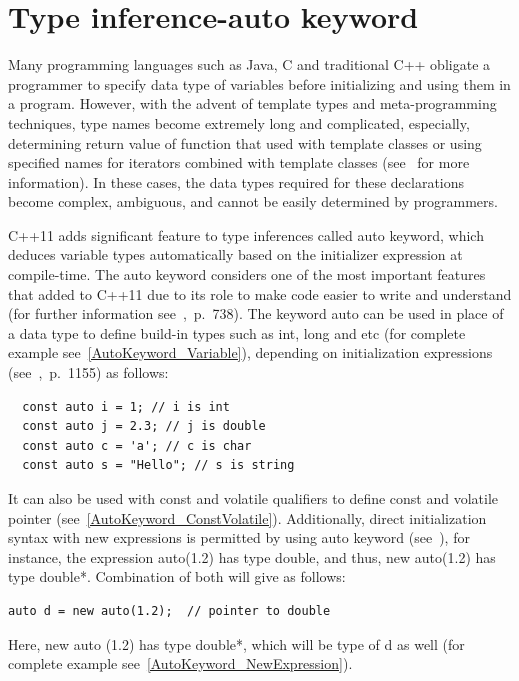 \documentclass[11pt]{report}
\begin{document}
\section{Type inference-auto keyword}
\label{section: Auto keyword}
Many programming languages such as Java, C and traditional C++ obligate a programmer to specify data type of variables before initializing and using them in a program. However, with the advent of template types and meta-programming techniques, type names become extremely long and complicated, especially, determining return value of function that used with template classes or using specified names for iterators combined with template classes (see~\cite{Stroustrup:2012:Cpp11} for more information). In these cases, the data types required for these declarations become complex, ambiguous, and cannot be easily determined by programmers.

C++11 adds significant feature to type inferences called auto keyword, which deduces variable types automatically based on the initializer expression at compile-time. The auto keyword considers one of the most important features that added to C++11 due to its role to make code easier to write and understand (for further information see~\cite{Gregorie:professionalcpp},~p.~738). The keyword auto can be used in place of a data type to define build-in types such as int, long and etc (for complete example see~\ref{AutoKeyword_Variable}), depending on initialization expressions (see~\cite{Prata:2012:Cpp},~p.~1155) as follows: 
\begin{lstlisting}
  const auto i = 1; // i is int
  const auto j = 2.3; // j is double
  const auto c = 'a'; // c is char
  const auto s = "Hello"; // s is string
\end{lstlisting}
It can also be used with const and volatile qualifiers to define const and volatile pointer (see~\ref{AutoKeyword_ConstVolatile}). Additionally, direct initialization syntax with new expressions is permitted by using auto keyword (see~\cite{Stroustrup:2012:Cpp11}), for instance, the expression auto(1.2) has type double, and thus, new auto(1.2) has type double*. Combination of both will give as follows:
\begin{lstlisting}
auto d = new auto(1.2);  // pointer to double
\end{lstlisting}

Here, new auto (1.2) has type double*, which will be type of d as well (for complete example see~\ref{AutoKeyword_NewExpression}).
\end{document}
